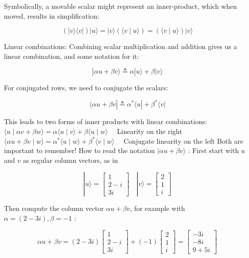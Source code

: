 \documentclass[main.tex]{subfiles}
\begin{document}
    Symbolically, a movable scalar might represent an inner-product, which when moved, results in simplification:
    
    $$
    (|v\rangle\langle v|)|u\rangle=|v\rangle(\langle v \mid u\rangle)=(\langle v \mid u\rangle)|v\rangle
    $$
    
    Linear combinations: Combining scalar multiplication and addition gives us a linear combination, and some notation for it:
    
    $$
    |\alpha u+\beta v\rangle \triangleq \alpha|u\rangle+\beta|v\rangle
    $$
    
    For conjugated rows, we need to conjugate the scalars:
    
    $$
    \langle\alpha u+\beta v| \triangleq \alpha^{*}\langle u|+\beta^{*}\langle v|
    $$
    
    This leads to two forms of inner products with linear combinations: $\langle u \mid \alpha v+\beta w\rangle=\alpha\langle u \mid v\rangle+\beta\langle u \mid w\rangle \quad$ Linearity on the right
    $\langle\alpha u+\beta v \mid w\rangle=\alpha^{*}\langle u \mid w\rangle+\beta^{*}\langle v \mid w\rangle \quad$ Conjugate linearity on the left Both are important to remember! How to read the notation $|\alpha u+\beta v\rangle$ : First start with $u$ and $v$ as regular column vectors, as in
    
    $$
    |u\rangle=\left[\begin{array}{r}
    1 \\
    2-i \\
    3 i
    \end{array}\right] \quad|v\rangle=\left[\begin{array}{l}
    2 \\
    1 \\
    i
    \end{array}\right]
    $$
    
    Then compute the column vector $\alpha u+\beta v$, for example with $\alpha=(2-3 i), \beta=-1$ :
    
    $$
    \alpha u+\beta v=(2-3 i)\left[\begin{array}{r}
    1 \\
    2-i \\
    3 i
    \end{array}\right]+(-1)\left[\begin{array}{l}
    2 \\
    1 \\
    i
    \end{array}\right]=\left[\begin{array}{r}
    -3 i \\
    -8 i \\
    9+5 i
    \end{array}\right]
    $$
    
\end{document}
